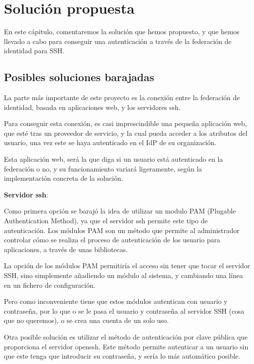 \chapter{Solución propuesta}

    En este cápitulo, comentaremos la solución que hemos propuesto, y que
    hemos llevado a cabo para conseguir una autenticación a través de la
    federación de identidad para SSH.

    \section{Posibles soluciones barajadas}

    La parte más importante de este proyecto es la conexión entre la
    federación de identidad, basada en aplicaciones web, y los servidores
    ssh.

    Para conseguir esta conexión, es casi imprescindible una pequeña
    aplicación web, que esté tras un proveedor de servicio, y la cual pueda
    acceder a los atributos del usuario, una vez este se haya autenticado
    en el IdP de su organización.

    Esta aplicación web, será la que diga si un usuario está
    autenticado en la federación o no, y su funcionamiento variará
    ligeramente, según la implementación concreta de la solución.

    \textbf{Servidor ssh}:

    Como primera opción se barajó la idea de utilizar un modulo PAM
    (Plugable Authentication Method), ya que el servidor ssh permite este
    tipo de autenticación. Los módulos PAM son un método que permite al
    administrador controlar cómo se realiza el proceso de autenticación de
    los usuario para aplicaciones, a través de unas bibliotecas.

    La opción de los módulos PAM permitiría el acceso sin tener que tocar
    el servidor SSH, sino simplemente añadiendo un módulo al sistema, y
    cambiando una línea en un fichero de configuración.

    Pero como inconveniente tiene que estos módulos autentican con usuario
    y contraseña, por lo que o se le pasa el usuario y contraseña al
    servidor SSH (cosa que no queremos), o se crea una cuenta de un solo
    uso.

    Otra posible solución es utilizar el método de autenticación por clave
    pública que proporciona el servidor openssh. Este método permite
    autenticar a un usuario sin que este tenga que introducir su
    contraseña, y sería lo más automático posible.

